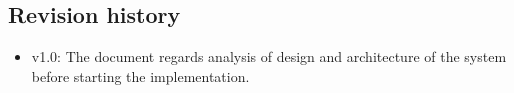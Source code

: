 \subsection{Revision history}
\begin{itemize}
\item v1.0: The document regards analysis of design and architecture of the system before starting the implementation.
\end{itemize}
